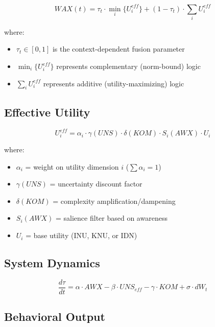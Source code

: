 \begin{equation}
\boxed{WAX(t) = \tau_t \cdot \min_i\{U_i^{eff}\} + (1-\tau_t) \cdot \sum_i U_i^{eff}}
\label{eq:wax-master}
\end{equation}

where:
\begin{itemize}
\item $\tau_t \in [0,1]$ is the context-dependent fusion parameter
\item $\min_i\{U_i^{eff}\}$ represents complementary (norm-bound) logic
\item $\sum_i U_i^{eff}$ represents additive (utility-maximizing) logic
\end{itemize}

\subsection{Effective Utility}

\begin{equation}
U_i^{eff} = \alpha_i \cdot \gamma(UNS) \cdot \delta(KOM) \cdot S_i(AWX) \cdot U_i
\label{eq:effective-utility}
\end{equation}

where:
\begin{itemize}
\item $\alpha_i$ = weight on utility dimension $i$ ($\sum \alpha_i = 1$)
\item $\gamma(UNS)$ = uncertainty discount factor
\item $\delta(KOM)$ = complexity amplification/dampening
\item $S_i(AWX)$ = salience filter based on awareness
\item $U_i$ = base utility (INU, KNU, or IDN)
\end{itemize}

\subsection{System Dynamics}

\begin{equation}
\frac{d\tau}{dt} = \alpha \cdot AWX - \beta \cdot UNS_{eff} - \gamma \cdot KOM + \sigma \cdot dW_t
\label{eq:tau-dynamics}
\end{equation}

\subsection{Behavioral Output}

